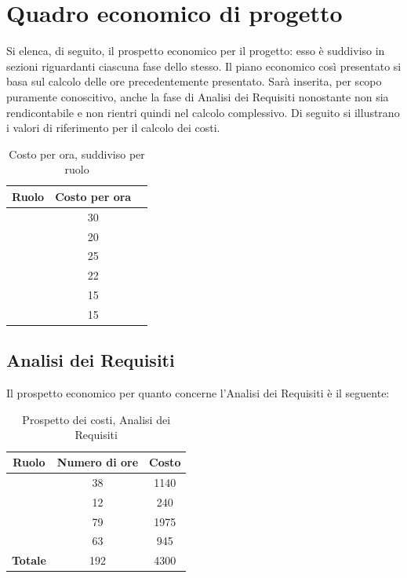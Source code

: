 \section{Quadro economico di progetto}
Si elenca, di seguito, il prospetto economico per il progetto: esso è suddiviso in sezioni riguardanti ciascuna fase dello stesso. Il piano economico così presentato si basa sul calcolo delle ore precedentemente presentato. Sarà inserita, per scopo puramente conoscitivo, anche la fase di Analisi dei Requisiti nonostante non sia rendicontabile e non rientri quindi nel calcolo complessivo. Di seguito si illustrano i valori di riferimento per il calcolo dei costi.

\begin{table}[H]
	\begin{center}
		\begin{tabular}{|c|c|c|}
			\hline
			\textbf{Ruolo}	& \textbf{Costo per ora} \\
			\hline
			\Res	&	30	\\
			\hline
			\Amm	&	20	\\
			\hline
			\Ana	&	25	\\
			\hline
			\Prog	&	22	\\
			\hline
			\Progr	&	15	\\
			\hline
			\Ver	&	15	\\
			\hline
		\end{tabular}
	\end{center}
	\caption{Costo per ora, suddiviso per ruolo}
\end{table}

\subsection{Analisi dei Requisiti}
Il prospetto economico per quanto concerne l'Analisi dei Requisiti è il seguente:


\begin{table}[H]
	\begin{center}
		\begin{tabular}{|c|c|c|}
			\hline
			\textbf{Ruolo}	& \textbf{Numero di ore} & \textbf{Costo} \\
			\hline
			\Res	&	38  &	1140	\\
			\hline
			\Amm	&	12  &	240	\\
			\hline
			\Ana	&	79  &	1975	\\
			\hline
			\Ver	&	63  &	945	\\
			\hline
			\textbf{Totale}  &	192	&	4300	\\
			\hline
		\end{tabular}
	\end{center}
	\caption{Prospetto dei costi, Analisi dei Requisiti }
\end{table}


